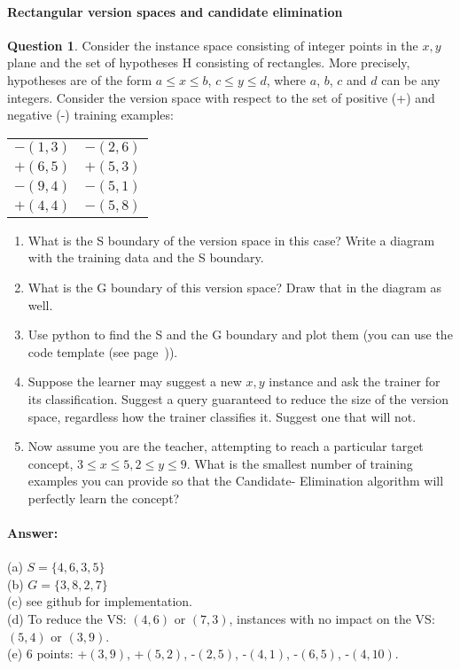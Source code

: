 \documentclass[11pt,a4paper]{article}
\theoremstyle{definition}%
\newtheorem{Q}{Question}[] %
\newcommand{\reponse}[1]{%
\ifthenelse {\boolean{corrige}} {\paragraph{Answer:} \color{darkblue}   #1\color{black}} {}
}
\begin{document}
\paragraph{Rectangular version spaces and candidate elimination}
\begin{Q}
    Consider the instance space consisting of integer points in the $x, y$ plane and the set of
hypotheses H consisting of rectangles. More precisely, hypotheses are of the form $a \leq x \leq b$,
$c \leq y \leq d$, where $a$, $b$, $c$ and $d$ can be any integers. Consider the version space with 
respect to the set of positive (+) and negative (-) training examples:

\begin{tabular}{ll}
$-(1,3)$ & $-(2,6)$ \\
$+(6,5)$ & $+(5,3)$ \\
$-(9,4)$ & $-(5,1)$ \\
$+(4,4)$ & $-(5,8)$
\end{tabular}

\begin{enumerate}
    \item What is the S boundary of the version space in this case? Write a diagram with the
        training data and the S boundary.
    \item What is the G boundary of this version space? Draw that in the diagram as well.
    \item Use python to find the S and the G boundary and plot them 
        (you can use the code template (see page~\pageref{source})).
    \item Suppose the learner may suggest a new $x, y$ instance and ask the trainer for its 
        classification. Suggest a query guaranteed to reduce the size of the version space, 
        regardless how the trainer classifies it. Suggest one that will not.
    \item Now assume you are the teacher, attempting to reach a particular target concept,
$3 \leq x \leq 5, 2 \leq y \leq 9$. What is the smallest number of training examples you can
provide so that the Candidate- Elimination algorithm will perfectly learn the concept?

\end{enumerate}

\reponse{
(a) $S = \{4,6,3,5\}$\\
(b) $G = \{3,8,2,7\}$\\
(c) see github for implementation.\\
(d) To reduce the VS: $(4, 6)$ or $(7, 3)$, instances with no impact on the VS: $(5, 4)$ or $(3, 9)$.\\
(e) 6 points: +$(3, 9)$, +$(5, 2)$, -$(2, 5)$, -$(4, 1)$, -$(6, 5)$, -$(4, 10)$.
}

\end{Q}
\end{document}

